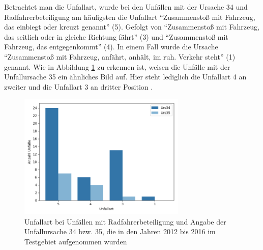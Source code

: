 Betrachtet man die Unfallart, wurde bei den Unfällen mit der Ursache 34 und Radfahrerbeteiligung am häufigsten die Unfallart \enquote{Zusammenstoß mit Fahrzeug, das einbiegt oder kreuzt genannt} (5). Gefolgt von \enquote{Zusammenstoß mit Fahrzeug, das seitlich oder in gleiche Richtung fährt} (3) und \enquote{Zusammenstoß mit Fahrzeug, das entgegenkommt} (4). In einem Fall wurde die Ursache \enquote{Zusammenstoß mit Fahrzeug, anfährt, anhält, im ruh. Verkehr steht} (1) genannt. Wie in Abbildung \ref{fig:Unfallart_Urs34_Urs35_Radbeteiligung} zu erkennen ist, weisen die Unfälle mit der Unfallursache 35 ein ähnliches Bild auf. Hier steht lediglich die Unfallart 4 an zweiter und die Unfallart 3 an dritter Position .

\begin{savenotes}
	\begin{figure}[H]
		\centering
		\includegraphics[width=8cm,height=6cm]{figures/Art_Urs34_Urs35}
		\caption[Unfallart bei Unfällen mit Radfahrerbeteiligung und Angabe der Unfallursache 34 bzw. 35, die in den Jahren 2012 bis 2016 im Testgebiet aufgenommen wurden]{Unfallart bei Unfällen mit Radfahrerbeteiligung und Angabe der Unfallursache 34 bzw. 35, die in den Jahren 2012 bis 2016 im Testgebiet aufgenommen wurden}\label{fig:Unfallart_Urs34_Urs35_Radbeteiligung}
	\end{figure}
\end{savenotes}

